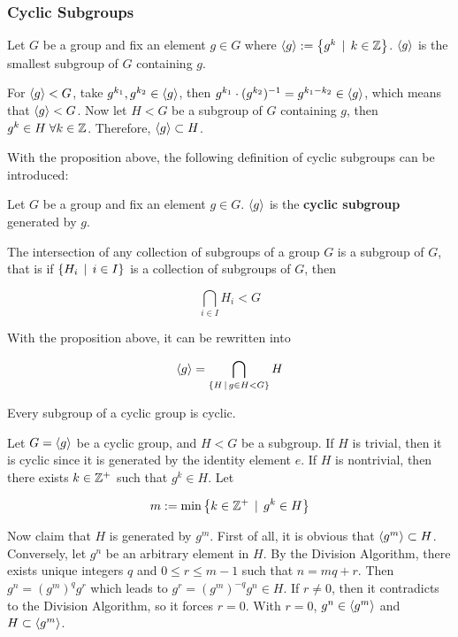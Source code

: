 \documentclass[a4paper,12pt]{article}
\begin{document}
\subsubsection{Cyclic Subgroups}
\begin{pst}
  Let $G$ be a group and fix an element $g\in G$ where $\left\langle g\right\rangle:=\left\{ g^{k}\,\mid\, k\in\mathbb{Z}\right\}$. $\left\langle g\right\rangle$ is the smallest subgroup of $G$ containing $g$.\n

  \prf For $\left\langle g\right\rangle<G$, take $g^{k_{1}},g^{k_{2}}\in\left\langle g\right\rangle$, then $g^{k_{1}}\cdot (g^{k_{2}})^{-1}=g^{k_{1}-k_{2}}\in\left\langle g\right\rangle$, which means that $\left\langle g\right\rangle<G$. Now let $H<G$ be a subgroup of $G$ containing $g$, then $g^{k}\in H\;\forall k\in\mathbb{Z}$. Therefore, $\left\langle g\right\rangle\subset H$.
\end{pst}\n

With the proposition above, the following definition of cyclic subgroups can be introduced:\n

\begin{dft}
  Let $G$ be a group and fix an element $g\in G$. $\left\langle g\right\rangle$ is the \textbf{cyclic subgroup} generated by $g$.
\end{dft}\n

\begin{pst}
  The intersection of any collection of subgroups of a group $G$ is a subgroup of $G$, that is if $\left\{ H_{i}\,\mid\, i\in I\right\}$ is a collection of subgroups of $G$, then

  $$\bigcap_{i\in I}H_{i}<G$$
\end{pst}\n

With the proposition above, it can be rewritten into

$$\left\langle g\right\rangle=\bigcap_{\left\{ H\,\mid\, g\in H<G\right\}}H$$\s

\begin{pst}
  Every subgroup of a cyclic group is cyclic.\n

  \prf Let $G=\left\langle g\right\rangle$ be a cyclic group, and $H<G$ be a subgroup. If $H$ is trivial, then it is cyclic since it is generated by the identity element $e$. If $H$ is nontrivial, then there exists $k\in\mathbb{Z}^{+}$ such that $g^{k}\in H$. Let

  $$m:=\min\left\{ k\in\mathbb{Z}^{+}\,\mid\, g^{k}\in H\right\}$$\s

  Now claim that $H$ is generated by $g^{m}$. First of all, it is obvious that $\left\langle g^{m}\right\rangle\subset H$. Conversely, let $g^{n}$ be an arbitrary element in $H$. By the Division Algorithm, there exists unique integers $q$ and $0\leq r\leq m-1$ such that $n=mq+r$. Then $g^{n}=(g^{m})^{q}g^{r}$ which leads to $g^{r}=(g^{m})^{-q}g^{n}\in H$. If $r\neq 0$, then it contradicts to the Division Algorithm, so it forces $r=0$. With $r=0$, $g^{n}\in\left\langle g^{m}\right\rangle$ and $H\subset\left\langle g^{m}\right\rangle$.
\end{pst}\n
\end{document}
